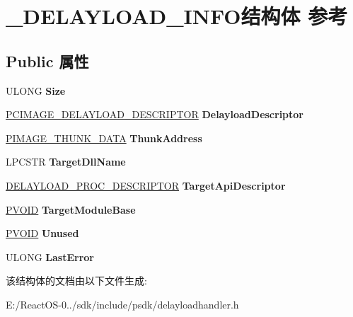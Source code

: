 \hypertarget{struct___d_e_l_a_y_l_o_a_d___i_n_f_o}{}\section{\+\_\+\+D\+E\+L\+A\+Y\+L\+O\+A\+D\+\_\+\+I\+N\+F\+O结构体 参考}
\label{struct___d_e_l_a_y_l_o_a_d___i_n_f_o}
\subsection*{Public 属性}
\begin{DoxyCompactItemize}
\item 
\mbox{\label{struct___d_e_l_a_y_l_o_a_d___i_n_f_o_a9b4598640e9088d68e8e64160783a81d}} 
U\+L\+O\+NG {\bfseries Size}
\item 
\mbox{\label{struct___d_e_l_a_y_l_o_a_d___i_n_f_o_a41fa34fb664625e79de55de96b896acb}} 
\hyperlink{struct___i_m_a_g_e___d_e_l_a_y_l_o_a_d___d_e_s_c_r_i_p_t_o_r}{P\+C\+I\+M\+A\+G\+E\+\_\+\+D\+E\+L\+A\+Y\+L\+O\+A\+D\+\_\+\+D\+E\+S\+C\+R\+I\+P\+T\+OR} {\bfseries Delayload\+Descriptor}
\item 
\mbox{\label{struct___d_e_l_a_y_l_o_a_d___i_n_f_o_ae80a5a5e5fd88a85fe22e715f542d898}} 
\hyperlink{struct___i_m_a_g_e___t_h_u_n_k___d_a_t_a32}{P\+I\+M\+A\+G\+E\+\_\+\+T\+H\+U\+N\+K\+\_\+\+D\+A\+TA} {\bfseries Thunk\+Address}
\item 
\mbox{\label{struct___d_e_l_a_y_l_o_a_d___i_n_f_o_aba29e1b3744ab9b89be5248d9dc651cb}} 
L\+P\+C\+S\+TR {\bfseries Target\+Dll\+Name}
\item 
\mbox{\label{struct___d_e_l_a_y_l_o_a_d___i_n_f_o_a846ea73f4fd981efd2c5a3cb3b0a038a}} 
\hyperlink{struct___d_e_l_a_y_l_o_a_d___p_r_o_c___d_e_s_c_r_i_p_t_o_r}{D\+E\+L\+A\+Y\+L\+O\+A\+D\+\_\+\+P\+R\+O\+C\+\_\+\+D\+E\+S\+C\+R\+I\+P\+T\+OR} {\bfseries Target\+Api\+Descriptor}
\item 
\mbox{\label{struct___d_e_l_a_y_l_o_a_d___i_n_f_o_affb6d23b5c270fa107c6e5a5d5f911e4}} 
\hyperlink{interfacevoid}{P\+V\+O\+ID} {\bfseries Target\+Module\+Base}
\item 
\mbox{\label{struct___d_e_l_a_y_l_o_a_d___i_n_f_o_a638d7bcb9f0386a682b0c59af8d6dde4}} 
\hyperlink{interfacevoid}{P\+V\+O\+ID} {\bfseries Unused}
\item 
\mbox{\label{struct___d_e_l_a_y_l_o_a_d___i_n_f_o_ade532ad8182cf2af16f9675a2ea3d887}} 
U\+L\+O\+NG {\bfseries Last\+Error}
\end{DoxyCompactItemize}


该结构体的文档由以下文件生成\+:\begin{DoxyCompactItemize}
\item 
E\+:/\+React\+O\+S-\/0../sdk/include/psdk/delayloadhandler.\+h\end{DoxyCompactItemize}
